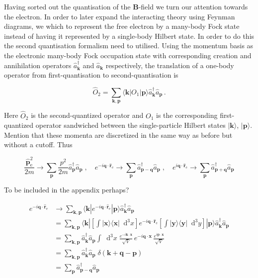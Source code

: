 \documentclass[12pt]{report}
\renewcommand{\vec}[1]{\boldsymbol{\mathbf{#1}}}                        %
\newcommand*\diff{\mathop{}\!\mathrm{d}}
\newcommand{\motivation}[1]{{\leavevmode\color{motivation}#1}}
\newcommand{\todo}[1]{{\leavevmode\color{todo}#1}}
\begin{document}
Having sorted out the quantisation of the $ \vec B $-field we turn our attention towards the electron. In order to later expand the interacting theory using Feynman diagrams, we which to represent the free electron by a many-body Fock state instead of having it represented by a single-body Hilbert state. In order to do this the second quantisation formalism need to utilised. Using the momentum basis as the electronic many-body Fock occupation state with corresponding creation and annihilation operators $ \hat a^\dagger_{\vec k} $ and $ \hat a_{\vec k} $ respectively, the translation of a one-body operator from first-quantisation to second-quantisation is\cite{quantumTheoryOfManyParticleSystems}

\begin{equation}
	\hat O_2 = \sum_{\vec k, \vec p} \langle \vec k | O_1 | \vec p \rangle \hat a^\dagger_{\vec k} \hat a_{\vec p} \,.
\end{equation}

Here $ \hat O_2 $ is the second-quantized operator and $ O_1 $ is the corresponding first-quantized operator sandwiched between the single-particle Hilbert states $ | \vec k \rangle $, $ | \vec p \rangle $. \todo{Mention that these momenta are discretized in the same way as before but without a cutoff}. Thus

\begin{equation}
	\frac{\hat{\vec p}_\text{e}^2}{2m} \rightarrow \sum_{\vec p} \frac{p^2}{2m} \hat a^\dagger_{\vec p} \hat a_{\vec p}
	\; , \quad
	e^{-i \vec q \cdot \hat{ \vec r}_\text{e}} \rightarrow \sum_{\vec p} \hat a^\dagger_{\vec p - \vec q} \hat a_{\vec p}
	\; , \quad
	e^{i \vec q \cdot \hat{ \vec r}_\text{e}} \rightarrow \sum_{\vec p} \hat a^\dagger_{\vec p + \vec q} \hat a_{\vec p}
\end{equation}

\motivation{
To be included in the appendix perhaps?

\begin{equation}
	\begin{split}
		e^{-i \vec q \cdot \hat{ \vec r}_\text{e}}
		& \rightarrow \sum_{\vec k, \vec p} \langle \vec k | e^{-i \vec q \cdot \hat{ \vec r}_\text{e}} | \vec p \rangle \hat a^\dagger_{\vec k} \hat a_{\vec p} \\
		& = \sum_{\vec k, \vec p} \langle \vec k |
			\left[ \int | \vec x \rangle \langle \vec x | \diff^3 x \right]
			e^{-i \vec q \cdot \hat{ \vec r}_\text{e}}
			\left[ \int | \vec y \rangle \langle \vec y | \diff^3 y \right]
			| \vec p \rangle \hat a^\dagger_{\vec k} \hat a_{\vec p} \\
		& = \sum_{\vec k, \vec p} \hat a^\dagger_{\vec k} \hat a_{\vec p}
			\int \diff^3 x \;
			\frac{e^{- i \vec k \cdot \vec x}}{\sqrt{V}} \,
			e^{-i \vec q \cdot \vec x} \,
			 \frac{e^{i \vec p \cdot \vec x}}{\sqrt{V}} \\
		& = \sum_{\vec k, \vec p} \hat a^\dagger_{\vec k} \hat a_{\vec p}
			\; \delta( \vec k + \vec q - \vec p) \\
		& = \sum_{\vec p} \hat a^\dagger_{\vec p - \vec q} \hat a_{\vec p}
	\end{split}
\end{equation}
}
\end{document}
